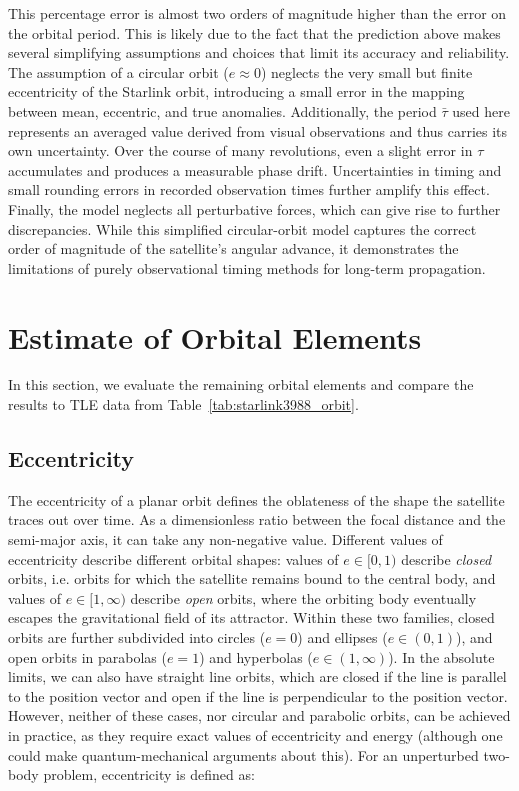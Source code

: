 \documentclass{article}
\begin{document}
This percentage error is almost two orders of magnitude higher than the error on the orbital period. This is likely due to the fact that the prediction above makes several simplifying assumptions and choices that limit its accuracy and reliability. The assumption of a circular orbit ($e \approx 0$) neglects the very small but finite eccentricity of the Starlink orbit, introducing a small error in the mapping between mean, eccentric, and true anomalies. Additionally, the period $\bar{\tau}$ used here represents an averaged value derived from visual observations and thus carries its own uncertainty. Over the course of many revolutions, even a slight error in $\tau$ accumulates and produces a measurable phase drift. Uncertainties in timing and small rounding errors in recorded observation times further amplify this effect. Finally, the model neglects all perturbative forces, which can give rise to further discrepancies. While this simplified circular-orbit model captures the correct order of magnitude of the satellite’s angular advance, it demonstrates the limitations of purely observational timing methods for long-term propagation.

\section{Estimate of Orbital Elements} \label{sec:orbital_elements}

In this section, we evaluate the remaining orbital elements and compare the results to TLE data from Table~\ref{tab:starlink3988_orbit}.

\subsection{Eccentricity} \label{sec:eccentricity}
The eccentricity of a planar orbit defines the oblateness of the shape the satellite traces out over time. As a dimensionless ratio between the focal distance and the semi-major axis, it can take any non-negative value. Different values of eccentricity describe different orbital shapes: values of $e \in [0, 1)$ describe \emph{closed} orbits, i.e. orbits for which the satellite remains bound to the central body, and values of $e \in [1, \infty)$ describe \emph{open} orbits, where the orbiting body eventually escapes the gravitational field of its attractor. Within these two families, closed orbits are further subdivided into circles ($e = 0$) and ellipses ($e \in (0, 1)$), and open orbits in parabolas ($e =1$) and hyperbolas ($e \in (1, \infty)$). In the absolute limits, we can also have straight line orbits, which are closed if the line is parallel to the position vector and open if the line is perpendicular to the position vector. However, neither of these cases, nor circular and parabolic orbits, can be achieved in practice, as they require exact values of eccentricity and energy (although one could make quantum-mechanical arguments about this). For an unperturbed two-body problem, eccentricity is defined as:
\end{document}
